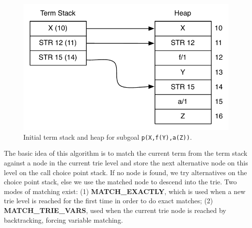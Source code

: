 \begin{figure}[ht]
  \centering
    \includegraphics[scale=0.6]{lookup_subgoal_termstack_start.pdf}
  \caption{Initial term stack and heap for subgoal \texttt{p(X,f(Y),a(Z))}.}
  \label{fig:lookup_subgoal_termstack_start}
\end{figure}

The basic idea of this algorithm is to match the current term from the term stack against a node in the current
trie level and store the next alternative node on this level on the call choice point stack. If no node
is found, we try alternatives on the choice point stack, else we use the matched node to descend into the trie.
Two modes of matching exist: (1) \textbf{MATCH\_EXACTLY}, which is used when a new trie level is reached for the
first time in order to do exact matches; (2) \textbf{MATCH\_TRIE\_VARS}, used when the current trie node is reached
by backtracking, forcing variable matching.

